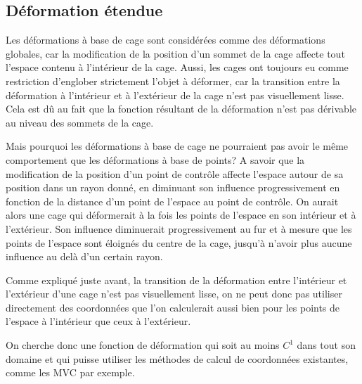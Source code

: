 \subsection{Déformation étendue}

Les déformations à base de cage sont considérées comme des déformations
globales, car la modification de la position d'un sommet de la cage affecte
tout l'espace contenu à l'intérieur de la cage. Aussi, les cages ont toujours
eu comme restriction d'englober strictement l'objet à déformer, car la
transition entre la déformation à l'intérieur et à l'extérieur de la cage
n'est pas visuellement lisse. Cela est dû au fait que la fonction résultant de
la déformation n'est pas dérivable au niveau des sommets de la cage.

Mais pourquoi les déformations à base de cage ne pourraient pas avoir le même
comportement que les déformations à base de points? A savoir que la
modification de la position d'un point de contrôle affecte l'espace autour de
sa position dans un rayon donné, en diminuant son influence progressivement en
fonction de la distance d'un point de l'espace au point de contrôle. On aurait
alors une cage qui déformerait à la fois les points de l'espace en son
intérieur et à l'extérieur. Son influence diminuerait progressivement au fur
et à mesure que les points de l'espace sont éloignés du centre de la cage,
jusqu'à n'avoir plus aucune influence au delà d'un certain rayon.

Comme expliqué juste avant, la transition de la déformation entre l'intérieur
et l'extérieur d'une cage n'est pas visuellement lisse, on ne peut donc pas
utiliser directement des coordonnées que l'on calculerait aussi bien pour les
points de l'espace à l'intérieur que ceux à l'extérieur. 

On cherche donc une fonction de déformation qui soit au moins $C^1$ dans tout
son domaine et qui puisse utiliser les méthodes de calcul de coordonnées
existantes, comme les MVC par exemple.




